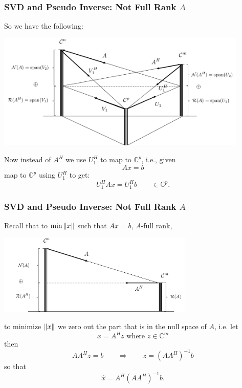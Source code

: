\documentclass{beamer}
\begin{document}
\begin{frame}\frametitle{SVD and Pseudo Inverse: Not Full Rank $A$}
	So we have the following:
	\begin{center}
		\includegraphics[width=0.9\textwidth]
			{figures/chap7_svd_1}
	\end{center}
	Now instead of $A^H$ we use $U_1^H$ to map to $\mathbb{C}^p$, i.e., given
	\[ 
		Ax = b
	\]
	map to $\mathbb{C}^p$ using $U_1^H$ to get:
	\[
		U_1^HAx = U_1^Hb \qquad \in\mathbb{C}^p.
	\]	
\end{frame}

\begin{frame}\frametitle{SVD and Pseudo Inverse: Not Full Rank $A$}
	\par{}
	
	Recall that to $\min\left\|x\right\|$ such that $Ax = b$, $A$-full rank,
	\begin{center}
		\includegraphics[width=0.7\textwidth]
			{figures/chap7_svd_3}
	\end{center}
	to minimize $\left\|x\right\|$ we zero out the part that is in the null space of $A$, i.e. let
	\[ 
		x = A^Hz \text{ where } z \in \mathbb{C}^m 
	\]
	then
	\[ 
		AA^Hz = b 
		\qquad \Rightarrow \qquad 
		z = (AA^H)^{-1}b 
	\]
	so that
	\[ 
		\hat{x} = A^H(AA^H)^{-1}b.
	\]
\end{frame}
\end{document}

